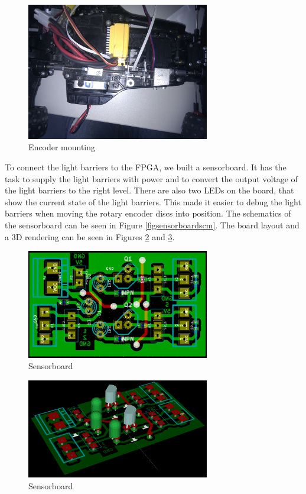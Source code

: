 \documentclass[12pt]{article}
\begin{document}
\begin{figure}[h]
\begin{center}
\includegraphics[width=8cm]{pic/encoders_top.jpg}
\caption{Encoder mounting}
\end{center}
\label{figencmount3}
\end{figure}


To connect the light barriers to the FPGA, we built a sensorboard. It has the task to supply the light barriers with power and to convert the output voltage of the light barriers to the right level.
There are also two LEDs on the board, that show the current state of the light barriers.
This made it easier to debug the light barriers when moving the rotary encoder discs into position.
The schematics of the sensorboard can be seen in Figure \ref{figsensorboardscm}. The board layout and a 3D rendering can be seen in Figures \ref{figsensorboardbrd} and \ref{figsensorboard3d}.

\begin{figure}[htb]
\begin{center}
\includegraphics[width=8cm]{pic/sensorboardbrd.png}
\caption{Sensorboard}
\end{center}
\label{figsensorboardbrd}
\end{figure}

\begin{figure}[htb]
\begin{center}
\includegraphics[width=8cm]{pic/sensorboard3d.png}
\caption{Sensorboard}
\end{center}
\label{figsensorboard3d}
\end{figure}
\end{document}
